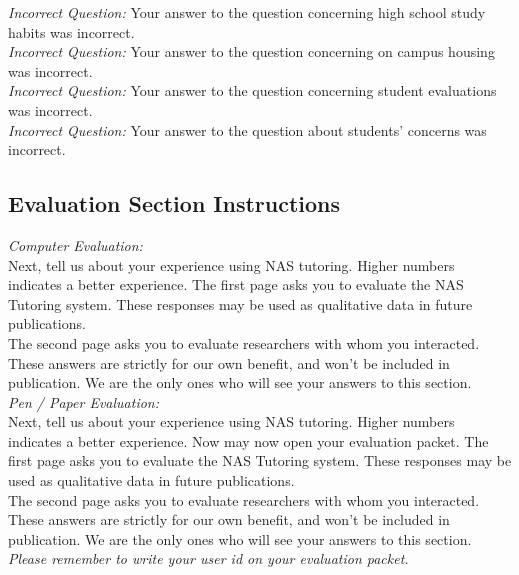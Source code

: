 \documentclass{sig-alternate-05-2015}
\begin{document}
\noindent \emph{Incorrect Question:} Your answer to the question concerning high school study habits was incorrect.\\

\noindent \emph{Incorrect Question:} Your answer to the question concerning on campus housing was incorrect.\\

\noindent \emph{Incorrect Question:} Your answer to the question concerning student evaluations was incorrect.\\

\noindent \emph{Incorrect Question:} Your answer to the question about students' concerns was incorrect.\\


\subsection{Evaluation Section Instructions}

\noindent \emph{Computer Evaluation:}\\
\noindent Next, tell us about your experience using NAS tutoring. Higher numbers indicates a better experience. The first page asks you to evaluate the NAS Tutoring system. These responses may be used as qualitative data in future publications.\\

\noindent The second page asks you to evaluate researchers with whom you interacted. These answers are strictly for our own benefit, and won't be included in publication. We are the only ones who will see your answers to this section.\\

\noindent \emph{Pen / Paper Evaluation:}\\
\noindent Next, tell us about your experience using NAS tutoring. Higher numbers indicates a better experience. Now may now open your evaluation packet. The first page asks you to evaluate the NAS Tutoring system. These responses may be used as qualitative data in future publications.\\

\noindent The second page asks you to evaluate researchers with whom you interacted. These answers are strictly for our own benefit, and won't be included in publication. We are the only ones who will see your answers to this section. \emph{Please remember to write your user id on your evaluation packet.}\\

\newpage
\end{document}
